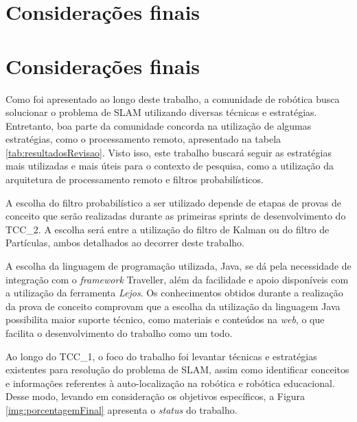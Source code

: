 \chapter[Considerações finais]{Considerações finais}

\chapter[Considerações finais]{Considerações finais}

Como foi apresentado ao longo deste trabalho, a comunidade de robótica busca solucionar o problema de SLAM utilizando diversas técnicas e estratégias. Entretanto, boa parte da comunidade concorda na utilização de algumas estratégias, como o processamento remoto, apresentado na tabela \ref{tab:resultadosRevisao}. Visto isso, este trabalho buscará seguir as estratégias mais utilizadas e mais úteis para o contexto de pesquisa, como a utilização da arquitetura de processamento remoto e filtros probabilísticos.

A escolha do filtro probabilístico a ser utilizado depende de etapas de provas de conceito que serão realizadas durante as primeiras sprints de desenvolvimento do TCC\_2. A escolha será entre a utilização do filtro de Kalman ou do filtro de Partículas, ambos detalhados ao decorrer deste trabalho.

A escolha da linguagem de programação utilizada, Java, se dá pela necessidade de integração com o \textit{framework} Traveller, além da facilidade e apoio disponíveis com a utilização da ferramenta \textit{Lejos}. Os conhecimentos obtidos durante a realização da prova de conceito comprovam que a escolha da utilização da linguagem Java possibilita maior suporte técnico, como materiais e conteúdos na \textit{web}, o que facilita o desenvolvimento do trabalho como um todo.

Ao longo do TCC\_1, o foco do trabalho foi levantar técnicas e estratégias existentes para resolução do problema de SLAM, assim como identificar conceitos e informações referentes à auto-localização na robótica e robótica educacional. Desse modo, levando em consideração os objetivos específicos, a Figura \ref{img:porcentagemFinal} apresenta o \textit{status} do trabalho.


